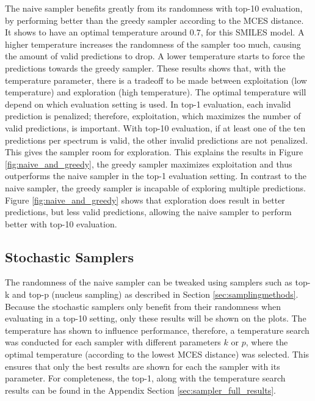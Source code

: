 The naive sampler benefits greatly from its randomness with top-10 evaluation, by performing better than the greedy sampler according to the MCES distance.
It shows to have an optimal temperature around $0.7$, for this SMILES model.
A higher temperature increases the randomness of the sampler too much, causing the amount of valid predictions to drop.
A lower temperature starts to force the predictions towards the greedy sampler.
These results shows that, with the temperature parameter, there is a tradeoff to be made between exploitation (low temperature) and exploration (high temperature).
The optimal temperature will depend on which evaluation setting is used.
In top-1 evaluation, each invalid prediction is penalized; therefore, exploitation, which maximizes the number of valid predictions, is important.
With top-10 evaluation, if at least one of the ten predictions per spectrum is valid, the other invalid predictions are not penalized. This gives the sampler room for exploration.
This explains the results in Figure \ref{fig:naive_and_greedy}, the greedy sampler maximizes exploitation and thus outperforms the naive sampler in the top-1 evaluation setting.
In contrast to the naive sampler, the greedy sampler is incapable of exploring multiple predictions.
Figure \ref{fig:naive_and_greedy} shows that exploration does result in better predictions, but less valid predictions, allowing the naive sampler to perform better with top-10 evaluation.

\subsection{Stochastic Samplers}

The randomness of the naive sampler can be tweaked using samplers such as top-k and top-p (nucleus sampling) as described in Section \ref{sec:samplingmethods}.
Because the stochastic samplers only benefit from their randomness when evaluating in a top-10 setting, only these results will be shown on the plots.
The temperature has shown to influence performance, therefore, a temperature search was conducted for each sampler with different parameters $k$ or $p$, where the optimal temperature (according to the lowest MCES distance) was selected.
This ensures that only the best results are shown for each the sampler with its parameter.
For completeness, the top-1, along with the temperature search results can be found in the Appendix Section \ref{sec:sampler_full_results}.

